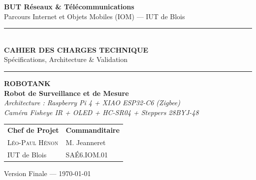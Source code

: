 \documentclass[a4paper,12pt]{report}
\begin{document}
\begin{titlepage}
    \begin{center}
        \vspace*{0.5cm}
        {\Large \textbf{\color{UTSlate}BUT Réseaux \& Télécommunications}}\\[0.2cm]
        {\small Parcours Internet et Objets Mobiles (IOM) — IUT de Blois}
        \vspace*{1.5cm}

        {\color{UTSlate}\rule{\linewidth}{1.2mm}} \\[0.5cm]
        {\Huge \bfseries \color{UTSlate} CAHIER DES CHARGES TECHNIQUE} \\[0.4cm]
        {\Large \color{UTGreen}Spécifications, Architecture \& Validation}\\[0.3cm]
        {\color{UTSlate}\rule{\linewidth}{1.2mm}}

        \vspace*{2cm}

        \begin{tcolorbox}[colback=UTLight, colframe=UTSlate, width=0.92\textwidth, arc=2mm, boxrule=0.8mm]
            \centering
            \vspace{0.3cm}
            {\Large \textbf{\color{UTSlate} ROBOTANK}}\\[0.2cm]
            {\large \textbf{\color{UTGreen}Robot de Surveillance et de Mesure}}\\[0.2cm]
            \textit{\color{UTSlate}Architecture : Raspberry Pi 4 + XIAO ESP32-C6 (Zigbee)}\\[0.1cm]
            \textit{\color{UTSlate}Caméra Fisheye IR + OLED + HC-SR04 + Steppers 28BYJ-48}
            \vspace{0.3cm}
        \end{tcolorbox}

        \vfill

        \begin{tabular}{p{} | p{}}
            \textbf{\color{UTSlate}Chef de Projet} & \textbf{\color{UTSlate}Commanditaire} \\
            \textsc{Léo-Paul Hénon} & M. Jeanneret \\
            IUT de Blois & SAÉ6.IOM.01 \\
        \end{tabular}

        \vspace*{1cm}
        {\small \color{UTSlate}Version Finale — \today}
    \end{center}
    \restoregeometry
\end{titlepage}
\end{document}
